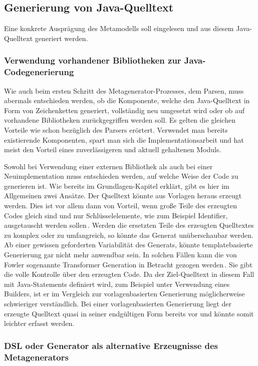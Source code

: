 \documentclass[12pt,oneside,a4paper,parskip]{scrbook}
\begin{document}
\subsection{Generierung von Java-Quelltext}

Eine konkrete Ausprägung des Metamodells soll eingelesen und aus diesem Java-Quelltext generiert werden.

\subsubsection{Verwendung vorhandener Bibliotheken zur Java-Codegenerierung}

Wie auch beim ersten Schritt des Metagenerator-Prozesses, dem Parsen, muss abermals entschieden werden, ob die Komponente, welche den Java-Quelltext in Form von Zeichenketten generiert, vollständig neu umgesetzt wird oder ob auf vorhandene Bibliotheken zurückgegriffen werden soll. Es gelten die gleichen Vorteile wie schon bezüglich des Parsers erörtert. Verwendet man bereits existierende Komponenten, spart man sich die Implementationsarbeit und hat meist den Vorteil eines zuverlässigeren und aktuell gehaltenen Moduls.

Sowohl bei Verwendung einer externen Bibliothek als auch bei einer Neuimplementation muss entschieden werden, auf welche Weise der Code zu generieren ist. Wie bereits im Grundlagen-Kapitel erklärt, gibt es hier im Allgemeinen zwei Ansätze. Der Quelltext könnte aus Vorlagen heraus erzeugt werden. Dies ist vor allem dann von Vorteil, wenn große Teile des erzeugten Codes gleich sind und nur Schlüsselelemente, wie zum Beispiel Identifier, ausgetauscht werden sollen\,\cite[S. 125]{fowler2010}. Werden die ersetzten Teile des erzeugten Quelltextes zu komplex oder zu umfangreich, so könnte das Generat unüberschaubar werden. Ab einer gewissen geforderten Variabilität des Generats, könnte templatebasierte Generierung gar nicht mehr anwendbar sein. In solchen Fällen kann die von Fowler sogenannte Transformer Generation in Betracht gezogen werden\,\cite[S. 125]{fowler2010}. Sie gibt die volle Kontrolle über den erzeugten Code. Da der Ziel-Quelltext in diesem Fall mit Java-Statements definiert wird, zum Beispiel unter Verwendung eines Builders, ist er im Vergleich zur vorlagenbasierten Generierung möglicherweise schwieriger verständlich. Bei einer vorlagenbasierten Generierung liegt der erzeugte Quelltext quasi in seiner endgültigen Form bereits vor und könnte somit leichter erfasst werden.

\subsubsection{DSL oder Generator als alternative Erzeugnisse des Metagenerators}
\end{document}
